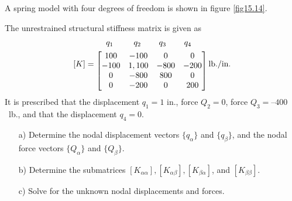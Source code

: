\documentclass{AeroStructure-ERJohnson}
\begin{document}
\begin{example*}\label{ex15.2}\setcounter{equation}{0}\def\theequation{\alph{equation}}A spring model with four degrees of freedom is shown in figure \ref{fig15.14}.

{\def\thefigure{15.14}
}


The unrestrained structural stiffness matrix is given as
\begin{align}\label{ex15.2a}
[K]=
\begin{array}{@{}l@{}}
{\arraycolsep=13pt\begin{array}{@{}l@{}}
\hspace*{12pt}q_{1} \hspace*{25pt} q_{2} \hspace*{22pt} q_{3} \hspace*{22pt} q_{4}
\end{array}}\\[4pt]
\left[\begin{array}{@{}cccc@{}} 100 & -100 & 0 & 0 \\-100 & 1,100 & -800 & -200 \\0 & -800 & 800 & 0 \\0 & -200 & 0 & 200\end{array}\right]
\end{array}\,\mathrm{lb.}/\text{in.}
\end{align}
It is prescribed that the displacement $q_1 = 1$ in., force ${Q}_2 = 0$, force ${Q}_3 = –400$~lb., and that the displacement ${q_4 = 0}$.
\begin{enumerate}[b)]
  \item[{\hskip13pt}a)] Determine the nodal displacement vectors $\{q_{\alpha}\}$ and $\{q_{\beta}\}$, and the nodal force vectors $\{Q_{\alpha}\}$ and $\{Q_{\beta}\}$.
  \item[{\hskip13pt}b)] Determine the submatrices $[K_{\alpha \alpha}],[K_{\alpha \beta}],[K_{\beta \alpha}]$, and $\left[K_{\beta \beta}\right]$.
  \item[{\hskip13pt}c)] Solve for the unknown nodal displacements and forces.
\end{enumerate}


\end{example*}
\end{document}
